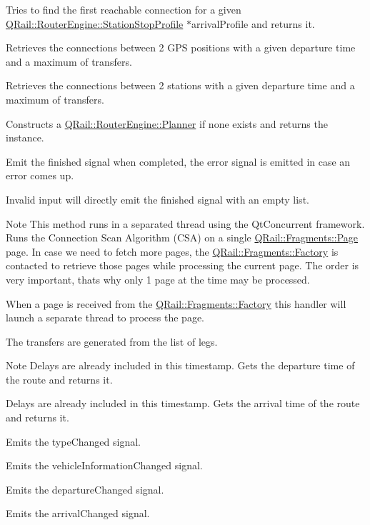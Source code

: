 Tries to find the first reachable connection for a given \mbox{\hyperlink{classQRail_1_1RouterEngine_1_1StationStopProfile}{Q\+Rail\+::\+Router\+Engine\+::\+Station\+Stop\+Profile}} $\ast$arrival\+Profile and returns it.

Retrieves the connections between 2 G\+PS positions with a given departure time and a maximum of transfers.

Retrieves the connections between 2 stations with a given departure time and a maximum of transfers.

Constructs a \mbox{\hyperlink{classQRail_1_1RouterEngine_1_1Planner}{Q\+Rail\+::\+Router\+Engine\+::\+Planner}} if none exists and returns the instance.

Emit the finished signal when completed, the error signal is emitted in case an error comes up.

Invalid input will directly emit the finished signal with an empty list.

\begin{DoxyNote}{Note}
This method runs in a separated thread using the Qt\+Concurrent framework. Runs the Connection Scan Algorithm (C\+SA) on a single \mbox{\hyperlink{classQRail_1_1Fragments_1_1Page}{Q\+Rail\+::\+Fragments\+::\+Page}} page. In case we need to fetch more pages, the \mbox{\hyperlink{classQRail_1_1Fragments_1_1Factory}{Q\+Rail\+::\+Fragments\+::\+Factory}} is contacted to retrieve those pages while processing the current page. The order is very important, that\textquotesingle{}s why only 1 page at the time may be processed.
\end{DoxyNote}
When a page is received from the \mbox{\hyperlink{classQRail_1_1Fragments_1_1Factory}{Q\+Rail\+::\+Fragments\+::\+Factory}} this handler will launch a separate thread to process the page.

The transfers are generated from the list of legs.

\begin{DoxyNote}{Note}
Delays are already included in this timestamp. Gets the departure time of the route and returns it.

Delays are already included in this timestamp. Gets the arrival time of the route and returns it.
\end{DoxyNote}
Emits the type\+Changed signal.

Emits the vehicle\+Information\+Changed signal.

Emits the departure\+Changed signal.

Emits the arrival\+Changed signal.

